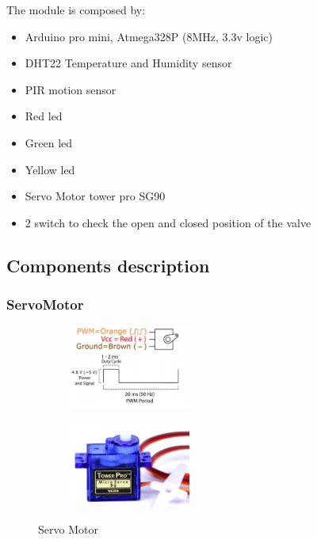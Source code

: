 The module is composed by:
\begin{itemize}
	\item Arduino pro mini, Atmega328P (8MHz, 3.3v logic)
	\item DHT22 Temperature and Humidity sensor
	\item PIR motion sensor
	\item Red led
	\item Green led
	\item Yellow led
	\item Servo Motor tower pro SG90
	\item 2 switch to check the open and closed position of the valve
\end{itemize}

\subsection{Components description}
\subsubsection{ServoMotor}
	\begin{figure}[h]
		\centering
		\begin{subfigure}{0.4\textwidth} %
			\includegraphics[width=4cm,keepaspectratio]{img/servo_signal}
			\end{subfigure}
		\vspace{1em} %
		\begin{subfigure}{0.4\textwidth} %
			\includegraphics[width=4cm,keepaspectratio]{img/servomotor}
		\end{subfigure}
		\caption{Servo Motor}
		\label{fig:ServoMotor}
	\end{figure}

